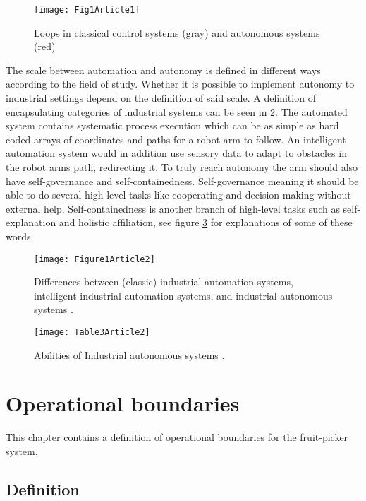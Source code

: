 \documentclass[%
oneside,    %
project,    %
nosummary   %
]{USN-MSc}
\begin{document}
\begin{figure}[!ht]
  \centering
  \texttt{[image: Fig1Article1]}
  \caption{Loops in classical control systems (gray) and autonomous systems (red) \cite{GAMER2019454}}
  \label{fig:Fig1Article1}
\end{figure}

The scale between automation and autonomy is defined in different ways according to the field of study. Whether it is possible to implement autonomy to industrial settings depend on the definition of said scale. A definition of encapsulating categories of industrial systems can be seen in \ref{fig:Fig1Article2}. The automated system contains systematic process execution which can be as simple as hard coded arrays of coordinates and paths for a robot arm to follow. An intelligent automation system would in addition use sensory data to adapt to obstacles in the robot arms path, redirecting it. To truly reach autonomy the arm should also have self-governance and self-containedness. Self-governance meaning it should be able to do several high-level tasks like cooperating and decision-making without external help. Self-containedness is another branch of high-level tasks such as self-explanation and holistic affiliation, see figure \ref{fig:Tab3Article2} for explanations of some of these words.

\begin{figure}[!ht]
  \centering
  \texttt{[image: Figure1Article2]}
  \caption{Differences between (classic) industrial automation systems, intelligent industrial automation systems, and industrial autonomous systems \cite{Müller}.}
  \label{fig:Fig1Article2}
\end{figure}


\begin{figure}[!ht]
  \centering
  \texttt{[image: Table3Article2]}
  \caption{Abilities of Industrial autonomous systems \cite{Müller}.}
  \label{fig:Tab3Article2}
\end{figure}



\chapter{Operational boundaries}
\label{ch:opBounds}
This chapter contains a definition of operational boundaries for the fruit-picker system.
\section{Definition}
\end{document}
